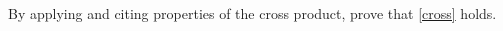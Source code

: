 \documentclass{exam}
\begin{document}
\begin{questions}
\begin{parts}
\item By applying and citing properties of the cross product, prove that \eqref{cross} holds. 

\begin{answer}{600pt}
\end{answer}

\end{parts} 
 



\end{questions}
\end{document}
